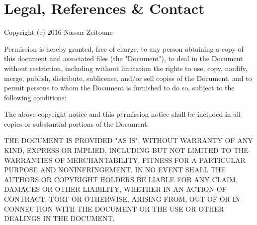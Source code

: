 \documentclass[10pt,twoside]{article}
\begin{document}
\newpage





\section{Legal, References \& Contact}

Copyright (c) 2016 Nassar Zeitoune

Permission is hereby granted, free of charge, to any person obtaining a copy of this document and associated files (the "Document"), to deal in the Document without restriction, including without limitation the rights to use, copy, modify, merge, publish, distribute, sublicense, and/or sell copies of the Document, and to permit persons to whom the Document is furnished to do so, subject to the following conditions:

The above copyright notice and this permission notice shall be included in all copies or substantial portions of the Document.

THE DOCUMENT IS PROVIDED "AS IS", WITHOUT WARRANTY OF ANY KIND, EXPRESS OR IMPLIED, INCLUDING BUT NOT LIMITED TO THE WARRANTIES OF MERCHANTABILITY, FITNESS FOR A PARTICULAR PURPOSE AND NONINFRINGEMENT. IN NO EVENT SHALL THE AUTHORS OR COPYRIGHT HOLDERS BE LIABLE FOR ANY CLAIM, DAMAGES OR OTHER LIABILITY, WHETHER IN AN ACTION OF CONTRACT, TORT OR OTHERWISE, ARISING FROM, OUT OF OR IN CONNECTION WITH THE DOCUMENT OR THE USE OR OTHER DEALINGS IN THE DOCUMENT.
\end{document}
